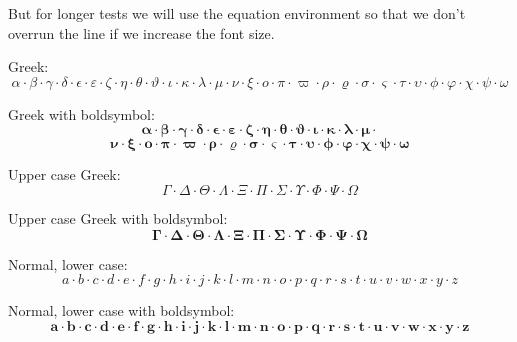 \documentclass[12pt,a4paper]{article}
\theoremstyle{clearprint}
\begin{document}
\noindent 
But for longer tests we will use the equation environment so that we don't overrun the line if we increase the font size.

\noindent 
Greek:
\begin{equation}
\alpha \cdot \beta \cdot \gamma \cdot \delta \cdot \epsilon \cdot \varepsilon \cdot \zeta \cdot \eta \cdot \theta \cdot \vartheta \cdot \iota \cdot \kappa \cdot \lambda \cdot \mu \cdot \nu \cdot \xi \cdot o \cdot \pi \cdot \varpi \cdot \rho \cdot \varrho \cdot \sigma \cdot \varsigma \cdot \tau \cdot \upsilon \cdot \phi \cdot \varphi \cdot \chi \cdot \psi \cdot \omega
\end{equation}

\noindent 
Greek with boldsymbol:
\begin{equation}
\boldsymbol{\alpha \cdot \beta \cdot \gamma \cdot \delta \cdot \epsilon \cdot \varepsilon \cdot \zeta \cdot \eta \cdot \theta \cdot \vartheta \cdot \iota \cdot \kappa \cdot \lambda \cdot \mu \cdot} 
\end{equation}
\begin{equation}
\boldsymbol{\nu \cdot \xi \cdot o \cdot \pi \cdot \varpi \cdot \rho \cdot \varrho \cdot \sigma \cdot \varsigma \cdot \tau \cdot \upsilon \cdot \phi \cdot \varphi \cdot \chi \cdot \psi \cdot \omega}
\end{equation}

\noindent 
Upper case Greek:
\begin{equation}
\Gamma \cdot \Delta \cdot \Theta \cdot \Lambda \cdot \Xi \cdot \Pi \cdot \Sigma \cdot \Upsilon \cdot \Phi \cdot \Psi \cdot \Omega
\end{equation}

\noindent 
Upper case Greek with boldsymbol:
\begin{equation}
\boldsymbol{\Gamma \cdot \Delta \cdot \Theta \cdot \Lambda \cdot \Xi \cdot \Pi \cdot \Sigma \cdot \Upsilon \cdot \Phi \cdot \Psi \cdot \Omega}
\end{equation}

\noindent 
Normal, lower case:
\begin{equation}
a \cdot b \cdot c \cdot d \cdot e \cdot f \cdot g \cdot h \cdot i \cdot j \cdot k \cdot l \cdot m \cdot n \cdot o \cdot p \cdot q \cdot r \cdot s \cdot t \cdot u \cdot v \cdot w \cdot x \cdot y \cdot z
\end{equation}

\noindent 
Normal, lower case with boldsymbol:
\begin{equation}
\boldsymbol{a \cdot b \cdot c \cdot d \cdot e \cdot f \cdot g \cdot h \cdot i \cdot j \cdot k \cdot l \cdot m \cdot n \cdot o \cdot p \cdot q \cdot r \cdot s \cdot t \cdot u \cdot v \cdot w \cdot x \cdot y \cdot z}
\end{equation}
\end{document}
